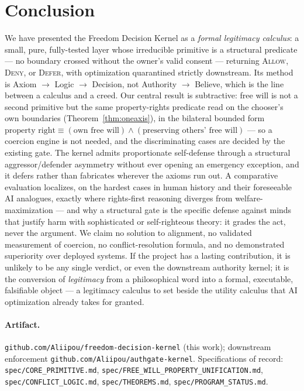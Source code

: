 \documentclass[11pt]{article}
\newcommand{\Allow}{\textsc{Allow}}
\newcommand{\Deny}{\textsc{Deny}}
\newcommand{\Defer}{\textsc{Defer}}
\begin{document}
\section{Conclusion}
\label{sec:conclusion}

We have presented the Freedom Decision Kernel as a \emph{formal legitimacy calculus}: a small,
pure, fully-tested layer whose irreducible primitive is a structural predicate --- no boundary
crossed without the owner's valid consent --- returning \Allow, \Deny, or \Defer, with
optimization quarantined strictly downstream. Its method is Axiom $\to$ Logic $\to$ Decision,
not Authority $\to$ Believe, which is the line between a calculus and a creed. Our central
result is subtractive: free will is not a second primitive but the same property-rights
predicate read on the chooser's own boundaries (Theorem~\ref{thm:oneaxis}), in the bilateral
bounded form $\text{property right}\equiv(\text{own free will})\wedge(\text{preserving others'
free will})$ --- so a coercion engine is not needed, and the discriminating cases are decided
by the existing gate. The kernel admits proportionate self-defense through a structural
aggressor/defender asymmetry without ever opening an emergency exception, and it defers rather
than fabricates wherever the axioms run out. A comparative evaluation localizes, on the hardest
cases in human history and their foreseeable AI analogues, exactly where rights-first reasoning
diverges from welfare-maximization --- and why a structural gate is the specific defense against
minds that justify harm with sophisticated or self-righteous theory: it grades the act, never
the argument. We claim no solution to alignment, no validated measurement of coercion, no
conflict-resolution formula, and no demonstrated superiority over deployed systems. If the
project has a lasting contribution, it is unlikely to be any single verdict, or even the
downstream authority kernel; it is the conversion of \emph{legitimacy} from a philosophical
word into a formal, executable, falsifiable object --- a legitimacy calculus to set beside the
utility calculus that AI optimization already takes for granted.

\paragraph{Artifact.} \texttt{github.com/Aliipou/freedom-decision-kernel} (this work);
downstream enforcement \texttt{github.com/Aliipou/authgate-kernel}. Specifications of record:
\texttt{spec/CORE\_PRIMITIVE.md}, \texttt{spec/FREE\_WILL\_PROPERTY\_UNIFICATION.md},
\texttt{spec/CONFLICT\_LOGIC.md}, \texttt{spec/THEOREMS.md}, \texttt{spec/PROGRAM\_STATUS.md}.
\end{document}
